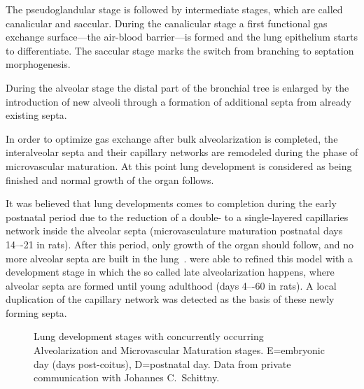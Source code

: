The pseudoglandular stage is followed by intermediate stages, which are called canalicular and saccular. During the canalicular stage a first functional gas exchange surface---the air-blood barrier---is formed and the lung epithelium starts to differentiate. The saccular stage marks the switch from branching to septation morphogenesis.

During the alveolar stage the distal part of the bronchial tree is enlarged by the introduction of new alveoli through a formation of additional septa from already existing septa. 

In order to optimize gas exchange after bulk alveolarization is completed, the interalveolar septa and their capillary networks are remodeled during the phase of microvascular maturation. At this point lung development is considered as being finished and normal growth of the organ follows.

It was believed that lung developments comes to completion during the early postnatal period due to the reduction of a double- to a single-layered capillaries network inside the alveolar septa (microvasculature maturation postnatal days 14–-21 in rats). After this period, only growth of the organ should follow, and no more alveolar septa are built in the lung~\cite{Burri1999,Schittny2004}. \citet{Schittny2008} were able to refined this model with a development stage in which the so called late alveolarization happens, where alveolar septa are formed until young adulthood (days 4–-60 in rats). A local duplication of the capillary network was detected as the basis of these newly forming septa.

\begin{figure}[htb]
	\noindent\makebox[\textwidth]{%
		\centering%
		}%
	\caption[Lung development stages]{Lung development stages with concurrently occurring Alveolarization and Microvascular Maturation stages. E=embryonic day (days post-coitus), D=postnatal day. Data from private communication with Johannes C.\ Schittny.}
	\label{fig:lung development stages new}
\end{figure}

